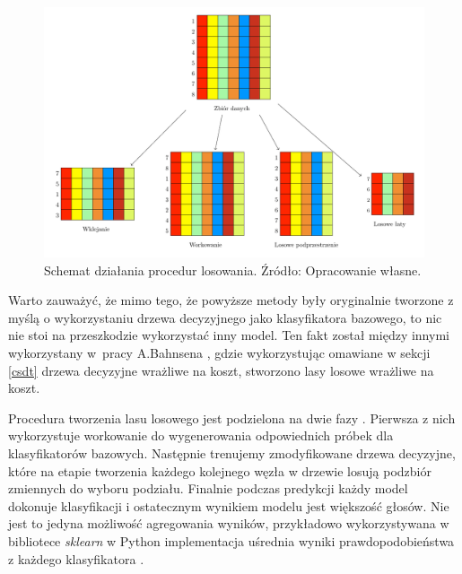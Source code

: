 \documentclass[inzynierska]{pwr_wmat_praca_dyplomowa}
\theoremstyle{plain}
\numberwithin{theorem}{chapter}
\theoremstyle{definition}
\numberwithin{theorem}{chapter}
\begin{document}
\begin{figure}[h]
	\includegraphics[width=\linewidth]{sampling_plot.pdf}
	\caption{Schemat działania procedur losowania. Źródło: Opracowanie własne.}
	\label{fig:sampling_plot}
\end{figure}

Warto zauważyć, że mimo tego, że powyższe metody były oryginalnie tworzone z myślą o wykorzystaniu drzewa decyzyjnego jako klasyfikatora bazowego, to nic nie stoi na przeszkodzie wykorzystać inny model. Ten fakt został między innymi wykorzystany w~pracy A.Bahnsena \cite{alej2015ensemble}, gdzie wykorzystując omawiane w sekcji \ref{csdt} drzewa decyzyjne wrażliwe na koszt, stworzono lasy losowe wrażliwe na koszt.

Procedura tworzenia lasu losowego jest podzielona na dwie fazy \cite{Random_Forest}. Pierwsza z nich wykorzystuje workowanie do wygenerowania odpowiednich próbek dla klasyfikatorów bazowych. Następnie trenujemy zmodyfikowane drzewa decyzyjne, które na etapie tworzenia każdego kolejnego węzła w drzewie losują podzbiór zmiennych do wyboru podziału. Finalnie podczas predykcji każdy model dokonuje klasyfikacji i ostatecznym wynikiem modelu jest większość głosów. Nie jest to jedyna możliwość agregowania wyników, przykładowo wykorzystywana w bibliotece \textit{sklearn} w Python implementacja uśrednia wyniki prawdopodobieństwa z każdego klasyfikatora \cite{sklearn_api}.
\end{document}
